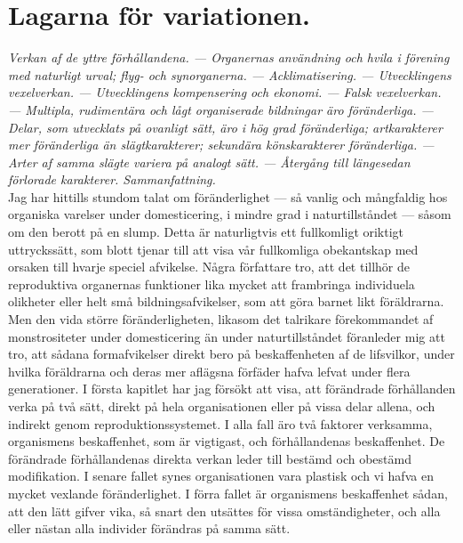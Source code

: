 




\chapter{Lagarna för variationen.}

{\it
Verkan af de yttre förhållandena. — Organernas användning och hvila i förening med naturligt urval; flyg- och synorganerna. — Acklimatisering. — Utvecklingens vexelverkan. — Utvecklingens kompensering och ekonomi. — Falsk vexelverkan. — Multipla, rudimentära och lågt organiserade bildningar äro föränderliga. — Delar, som utvecklats på ovanligt sätt, äro i hög grad föränderliga; artkarakterer mer föränderliga än slägtkarakterer; sekundära könskarakterer föränderliga. — Arter af samma slägte variera på analogt sätt. — Återgång till längesedan förlorade karakterer. Sammanfattning.
}\\[0.5cm]

Jag har hittills stundom talat om föränderlighet — så vanlig och mångfaldig hos organiska varelser under domesticering, i mindre grad i naturtillståndet — såsom om den berott på en slump. Detta är naturligtvis ett fullkomligt oriktigt uttryckssätt, som blott tjenar till att visa vår fullkomliga obekantskap med orsaken till hvarje speciel afvikelse. Några författare tro, att det tillhör de reproduktiva organernas funktioner lika mycket att frambringa individuela olikheter eller helt små bildningsafvikelser, som att göra barnet likt föräldrarna. Men den vida större föränderligheten, likasom det talrikare förekommandet af monstrositeter under domesticering än under naturtillståndet föranleder mig att tro, att sådana formafvikelser direkt bero på beskaffenheten af de lifsvilkor, under hvilka föräldrarna och deras mer aflägsna förfäder hafva lefvat under flera generationer. I första kapitlet har jag försökt att visa, att förändrade förhållanden verka på två sätt, direkt på hela organisationen eller på vissa delar allena, och indirekt genom reproduktionssystemet. I alla fall äro två faktorer verksamma, organismens beskaffenhet, som är vigtigast, och förhållandenas beskaffenhet. De förändrade förhållandenas direkta verkan leder till bestämd och obestämd modifikation. I senare fallet synes organisationen vara plastisk och vi hafva en mycket vexlande föränderlighet. I förra fallet är organismens beskaffenhet sådan, att den lätt gifver vika, så snart den utsättes för vissa omständigheter, och alla eller nästan alla individer förändras på samma sätt.

